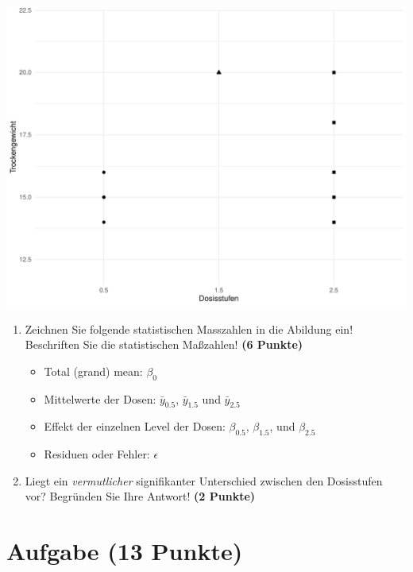 \documentclass[a4paper, 9pt]{scrartcl}\usepackage[]{graphicx}\usepackage[]{xcolor}
\makeatletter
\def\maxwidth{ %
  \ifdim\Gin@nat@width>\linewidth
    \linewidth
  \else
    \Gin@nat@width
  \fi
}
\newenvironment{knitrout}{}{} %
\makeatother
\begin{document}
\begin{knitrout}
\color{fgcolor}

{\centering \includegraphics[width=\maxwidth]{img/anova-01-a-1} 

}


\end{knitrout}

\begin{enumerate}
\item Zeichnen Sie folgende statistischen Masszahlen in die Abildung ein!
  Beschriften Sie die statistischen Ma{\ss}zahlen! \textbf{(6 Punkte)}
  \begin{itemize}
  \item Total (grand) mean: $\beta_0$
  \item Mittelwerte der Dosen: $\bar{y}_{0.5}$, $\bar{y}_{1.5}$ und $\bar{y}_{2.5}$
  \item Effekt der einzelnen Level der Dosen: $\beta_{0.5}$, $\beta_{1.5}$,
    und $\beta_{2.5}$
  \item Residuen oder Fehler: $\epsilon$
  \end{itemize}
\item Liegt ein \textit{vermutlicher} signifikanter Unterschied zwischen
  den Dosisstufen vor? Begr{\"u}nden Sie Ihre Antwort! \textbf{(2 Punkte)}
\end{enumerate}
 
\clearpage

\section{Aufgabe \hfill (13 Punkte)}
\end{document}
